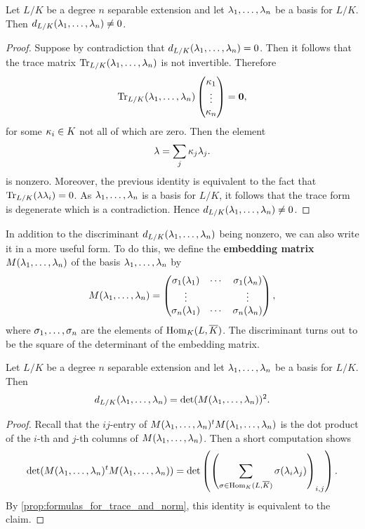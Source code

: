     \begin{proposition}\label{prop:discriminant_not_zero}
      Let \(L/K\) be a degree \(n\) separable extension and let \(\lambda_{1},\ldots,\lambda_{n}\) be a basis for \(L/K\). Then \(d_{L/K}(\lambda_{1},\ldots,\lambda_{n}) \neq 0\).
    \end{proposition}
    \begin{proof}
      Suppose by contradiction that \(d_{L/K}(\lambda_{1},\ldots,\lambda_{n}) = 0\). Then it follows that the trace matrix \(\operatorname{\mathrm{Tr}}_{L/K}(\lambda_{1},\ldots,\lambda_{n})\) is not invertible. Therefore
      \[
        \operatorname{\mathrm{Tr}}_{L/K}(\lambda_{1},\ldots,\lambda_{n})\begin{pmatrix} \kappa_{1} \\ \vdots \\ \kappa_{n} \end{pmatrix} = \mathbf{0},
      \]
      for some \(\kappa_{i} \in K\) not all of which are zero. Then the element
      \[
        \lambda = \sum_{j}\kappa_{j}\lambda_{j}.
      \]
      is nonzero. Moreover, the previous identity is equivalent to the fact that \(\operatorname{\mathrm{Tr}}_{L/K}(\lambda\lambda_{i}) = 0\). As \(\lambda_{1},\ldots,\lambda_{n}\) is a basis for \(L/K\), it follows that the trace form is degenerate which is a contradiction. Hence \(d_{L/K}(\lambda_{1},\ldots,\lambda_{n}) \neq 0\).
    \end{proof}

    In addition to the discriminant \(d_{L/K}(\lambda_{1},\ldots,\lambda_{n})\) being nonzero, we can also write it in a more useful form. To do this, we define the \textbf{embedding matrix} \(M(\lambda_{1},\ldots,\lambda_{n})\) of the basis \(\lambda_{1},\ldots,\lambda_{n}\) by
    \[
      M(\lambda_{1},\ldots,\lambda_{n}) = \begin{pmatrix} \sigma_{1}(\lambda_{1}) & \cdots & \sigma_{1}(\lambda_{n}) \\ \vdots & & \vdots \\ \sigma_{n}(\lambda_{1}) & \cdots & \sigma_{n}(\lambda_{n}) \end{pmatrix},
    \]
    where \(\sigma_{1},\ldots,\sigma_{n}\) are the elements of \(\operatorname{\mathrm{Hom}}_{K}(L,\overline{K})\). The discriminant turns out to be the square of the determinant of the embedding matrix.

    \begin{proposition}\label{disc_as_square_of_embedding_matrix}
      Let \(L/K\) be a degree \(n\) separable extension and let \(\lambda_{1},\ldots,\lambda_{n}\) be a basis for \(L/K\). Then
      \[
        d_{L/K}(\lambda_{1},\ldots,\lambda_{n}) = \det(M(\lambda_{1},\ldots,\lambda_{n}))^{2}.
      \]
    \end{proposition}
    \begin{proof}
      Recall that the \(ij\)-entry of \(M(\lambda_{1},\ldots,\lambda_{n})^{t}M(\lambda_{1},\ldots,\lambda_{n})\) is the dot product of the \(i\)-th and \(j\)-th columns of \(M(\lambda_{1},\ldots,\lambda_{n})\). Then a short computation shows
      \[
        \det(M(\lambda_{1},\ldots,\lambda_{n})^{t}M(\lambda_{1},\ldots,\lambda_{n})) = \det\left(\left(\sum_{\sigma \in \operatorname{\mathrm{Hom}}_{K}(L,\overline{K})}\sigma(\lambda_{i}\lambda_{j})\right)_{i,j}\right).
      \]
      By \cref{prop:formulas_for_trace_and_norm}, this identity is equivalent to the claim.
    \end{proof}

